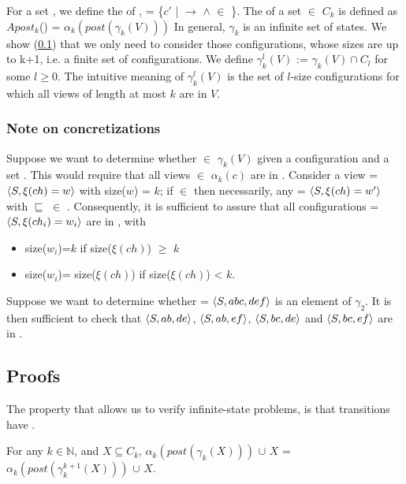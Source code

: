 For a set , we define the  of ,  = \{$c'$ |  $\rightarrow$  $\wedge$  $\in$ \}. The  of a set  $\in$ $C_k$ is defined as $Apost_k$() = $\alpha_k(post(\gamma_k(V)))$ In general, $\gamma_k$ is an infinite set of states. We show (\ref{proof}) that we only need to consider those configurations, whose sizes are up to k+1, i.e. a finite set of configurations. We define $\gamma_k^l(V)$ := $\gamma_k(V) \cap C_l$ for some $l\geq 0$. The intuitive meaning of $\gamma_k^l(V)$ is the set of $l$-size configurations for which all views of length at most $k$ are in $V$.

\subsubsection{Note on concretizations}
Suppose we want to determine whether  $\in$ $\gamma_k(V)$ given a configuration  and a set . This would require that all views  $\in$ $\alpha_k(c)$ are in . Consider a view  = $\langle S, \xi(ch)=w\rangle$ with size($w$) = $k$; if  $\in$  then necessarily, any  = $\langle S, \xi(ch)=w'\rangle$ with  $\sqsubseteq$  $\in$ . Consequently, it is sufficient to assure that all configurations  = $\langle S,\xi(ch_i)=w_i\rangle$ are in , with

\begin{itemize}
\item
size($w_i$)=$k$ if size($\xi(ch)$) $\geq$ $k$
\item
size($w_i$)= size($\xi(ch)$) if size($\xi(ch)$) < $k$.
\end{itemize}

 Suppose we want to determine whether  = $\langle S, abc, def\rangle$ is an element of $\gamma_2$. It is then sufficient to check that $\langle S,ab,de\rangle$, $\langle S,ab,ef\rangle$, $\langle S,bc ,de\rangle$ and $\langle S,bc,ef\rangle$ are in .




\subsection{Proofs}
\label{proof}
The property that allows us to verify infinite-state problems, is that transitions have .

\begin{lemma}
\label{lemma1}
For any $k\in\mathbb{N}$, and $X\subseteq C_k$, $\alpha_k(post(\gamma_k(X)))$ $\cup$ $X$ = $\alpha_k(post(\gamma_k^{k+1}(X)))$ $\cup$ $X$.
\end{lemma}

